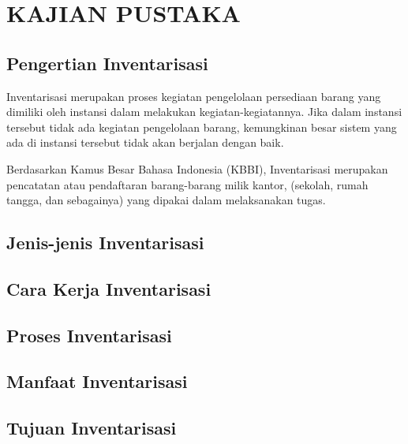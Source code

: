 
\chapter{KAJIAN PUSTAKA} 

\section{Pengertian Inventarisasi}

Inventarisasi merupakan proses kegiatan pengelolaan persediaan barang yang dimiliki oleh instansi dalam melakukan kegiatan-kegiatannya. Jika dalam instansi tersebut tidak ada kegiatan pengelolaan barang, kemungkinan besar sistem yang ada di instansi tersebut tidak akan berjalan dengan baik.

Berdasarkan Kamus Besar Bahasa Indonesia (KBBI), Inventarisasi merupakan pencatatan atau pendaftaran barang-barang milik kantor, (sekolah, rumah tangga, dan sebagainya) yang dipakai dalam melaksanakan tugas.

\section{Jenis-jenis Inventarisasi}
\section{Cara Kerja Inventarisasi}
\section{Proses Inventarisasi}
\section{Manfaat Inventarisasi}
\section{Tujuan Inventarisasi}

